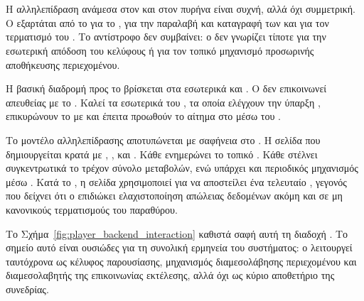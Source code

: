 \section{}
\label{sec:player_backend_interaction}

Η αλληλεπίδραση ανάμεσα στον  και στον  πυρήνα είναι συχνή, αλλά όχι συμμετρική. Ο  εξαρτάται από το  για το , για την παραλαβή και καταγραφή των  και για τον τερματισμό του . Το αντίστροφο δεν συμβαίνει: ο  δεν γνωρίζει τίποτε για την εσωτερική απόδοση του κελύφους  ή για τον τοπικό μηχανισμό προσωρινής αποθήκευσης περιεχομένου.

Η βασική διαδρομή προς το  βρίσκεται στα εσωτερικά  \texttt{} και \texttt{}. Ο  δεν επικοινωνεί απευθείας με το . Καλεί τα εσωτερικά  του , τα οποία ελέγχουν την ύπαρξη , επικυρώνουν το  με \texttt{}  και έπειτα προωθούν το αίτημα στο  μέσω του \texttt{}.

Το μοντέλο αλληλεπίδρασης αποτυπώνεται με σαφήνεια στο \texttt{}. Η σελίδα που δημιουργείται κρατά  με \texttt{}, \texttt{}, \texttt{} και \texttt{} . Κάθε \texttt{} ενημερώνει το τοπικό . Κάθε  στέλνει συγκεντρωτικά το τρέχον σύνολο μεταβολών, ενώ υπάρχει και περιοδικός μηχανισμός  μέσω \texttt{}. Κατά το , η σελίδα χρησιμοποιεί \texttt{} για να αποστείλει ένα τελευταίο , γεγονός που δείχνει ότι ο  επιδιώκει ελαχιστοποίηση απώλειας δεδομένων ακόμη και σε μη κανονικούς τερματισμούς του παραθύρου.

Το Σχήμα~\ref{fig:player_backend_interaction} καθιστά σαφή αυτή τη διαδοχή . Το σημείο αυτό είναι ουσιώδες για τη συνολική ερμηνεία του συστήματος: ο  λειτουργεί ταυτόχρονα ως κέλυφος παρουσίασης, μηχανισμός διαμεσολάβησης περιεχομένου και διαμεσολαβητής της επικοινωνίας εκτέλεσης, αλλά όχι ως κύριο αποθετήριο της συνεδρίας.


